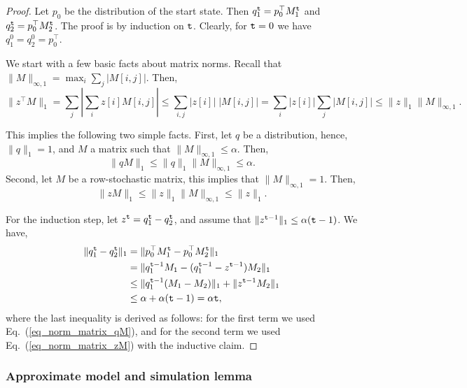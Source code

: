 \begin{proof}
Let $p_0$ be the distribution of the start state. Then
$q_1^{\tt t}=p_0^\top M_1^{\tt t}$ and $q_2^{\tt t}=p_0^\top
M_2^{\tt t}$. The proof is by induction on ${\tt t}$. Clearly, for
${\tt t}=0$ we have $q_1^0=q_2^0=p_0^\top$.

We start with a few basic facts about matrix norms. Recall that
$\|M\|_{\infty,1} = \max_i \sum_j |M[i,j]|$. Then,
\begin{equation}
\label{eq_norm_matrix_1}
%
\| z^\top M\|_1 = \sum_j | \sum_i z[i] M[i,j]|\leq \sum_{i,j} |z[i]|\;
|M[i,j] | = \sum_i |z[i]| \sum_j  |M[i,j]| \leq \|z\|_1
\|M\|_{\infty,1}.
\end{equation}

This implies the following two simple facts. First, let $q$ be a
distribution, hence, $\|q\|_1=1$, and $M$ a matrix such that
$\|M\|_{\infty,1} \leq \alpha $. Then,
\begin{equation}
\label{eq_norm_matrix_qM} \|qM\|_1 \leq \|q\|_1 \|M\|_{\infty,1}
 \leq \alpha.
\end{equation}
Second, let $M$ be a row-stochastic matrix, this implies that
$\|M\|_{\infty,1}=1$. Then,
\begin{equation}
\label{eq_norm_matrix_zM} \|zM\|_1 \leq \|z\|_1 \|M\|_{\infty,1}
\leq \|z\|_1.
\end{equation}

For the induction step, let $z^{\tt t}=q_1^{\tt t}-q_2^{\tt t}$, and assume that 
$\|z^{{\tt t}-1}\|_1 \leq \alpha ({\tt t}-1)$. We
have,
\begin{align*}
\|q_1^{\tt t}-q_2^{\tt t}\|_1 &= \|p_0^\top M_1^{\tt t}-p_0^\top M_2^{\tt t}\|_1\\
&= \|q_1^{{\tt t}-1}M_1 - (q_1^{{\tt t}-1}-z^{{\tt t}-1})M_2\|_1\\
&\leq \|q_1^{{\tt t}-1} (M_1-M_2)\|_1 + \|z^{{\tt t}-1}M_2\|_1\\
&\leq \alpha + \alpha ({\tt t}-1) = \alpha{\tt t},
\end{align*}
where the last inequality is derived as follows: for the first
term we used Eq.~(\ref{eq_norm_matrix_qM}), and for the second term we
used Eq.~(\ref{eq_norm_matrix_zM}) with the inductive claim.
\end{proof}

\subsubsection{Approximate model and simulation lemma}

